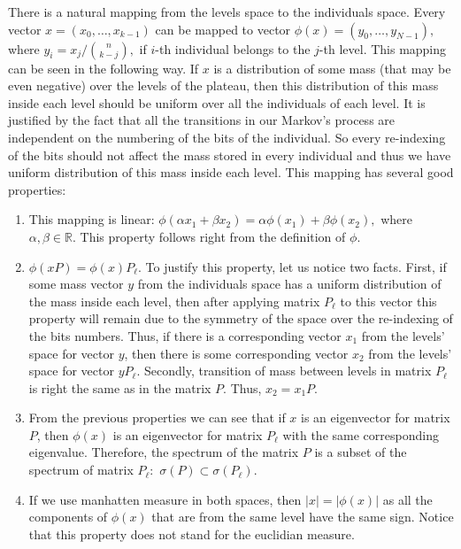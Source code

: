 \documentclass{article}
\begin{document}
There is a natural mapping from the levels space to the individuals space. Every vector $x = (x_0, \dots, x_{k - 1})$ can be mapped to vector $\phi(x) = (y_0, \dots, y_{N - 1}),$ where $y_i = x_j / \binom{n}{k - j}, $ if $i$-th individual belongs to the $j$-th level. This mapping can be seen in the following way. If $x$ is a distribution of some mass (that may be even negative) over the levels of the plateau, then this distribution of this mass inside each level should be uniform over all the individuals of each level. It is justified by the fact that all the transitions in our Markov's process are independent on the numbering of the bits of the individual. So every re-indexing of the bits should not affect the mass stored in every individual and thus we have uniform distribution of this mass inside each level. This mapping has several good properties:

\begin{enumerate}
  \item This mapping is linear: $\phi(\alpha x_1 + \beta x_2) = \alpha \phi(x_1) + \beta \phi(x_2),$ where $\alpha, \beta \in \mathbb{R}.$ This property follows right from the definition of $\phi.$
  \item $\phi(x P) = \phi(x) P_\ell.$ To justify this property, let us notice two facts. First, if some mass vector $y$ from the individuals space has a uniform distribution of the mass inside each level, then after applying matrix $P_\ell$ to this vector this property will remain due to the symmetry of the space over the re-indexing of the bits numbers. Thus, if there is a corresponding vector $x_1$ from the levels' space for vector $y$, then there is some corresponding vector $x_2$ from the levels' space for vector $yP_\ell.$ Secondly, transition of mass between levels in matrix $P_\ell$ is right the same as in the matrix $P.$ Thus, $x_2 = x_1 P.$
  \item From the previous properties we can see that if $x$ is an eigenvector for matrix $P$, then $\phi(x)$ is an eigenvector for matrix $P_\ell$ with the same corresponding eigenvalue. Therefore, the spectrum of the matrix $P$ is a subset of the spectrum of matrix $P_\ell:$ $\sigma(P) \subset \sigma(P_\ell).$
  \item If we use manhatten measure in both spaces, then $|x| = |\phi(x)|$ as all the components of $\phi(x)$ that are from the same level have the same sign. Notice that this property does not stand for the euclidian measure.
\end{enumerate}
\end{document}
